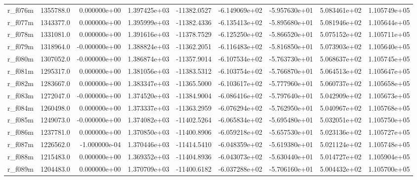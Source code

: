 \documentclass[10pt]{article}
\begin{document}
\begin{landscape}
\begin{longtable}{|l|r|r|r|r|r|r|r|r|}
r\_f076m                 &  1355788.0 &  0.000000e+00 &  1.397425e+03 & -11382.0527 & -6.149069e+02 & -5.957630e+01 &  5.083461e+02 &  1.105749e+05 \\
r\_f077m                 &  1343377.0 &  0.000000e+00 &  1.395999e+03 & -11382.4336 & -6.135413e+02 & -5.895680e+01 &  5.081946e+02 &  1.105644e+05 \\
r\_f078m                 &  1331081.0 &  0.000000e+00 &  1.391616e+03 & -11378.7529 & -6.125250e+02 & -5.866520e+01 &  5.075152e+02 &  1.105711e+05 \\
r\_f079m                 &  1318964.0 & -0.000000e+00 &  1.388824e+03 & -11362.2051 & -6.116483e+02 & -5.816850e+01 &  5.073903e+02 &  1.105640e+05 \\
r\_f080m                 &  1307052.0 & -0.000000e+00 &  1.386874e+03 & -11357.9014 & -6.107534e+02 & -5.763730e+01 &  5.068637e+02 &  1.105745e+05 \\
r\_f081m                 &  1295317.0 &  0.000000e+00 &  1.381056e+03 & -11383.5312 & -6.103754e+02 & -5.766870e+01 &  5.064513e+02 &  1.105647e+05 \\
r\_f082m                 &  1283667.0 &  0.000000e+00 &  1.383347e+03 & -11365.5000 & -6.103617e+02 & -5.777960e+01 &  5.060737e+02 &  1.105658e+05 \\
r\_f083m                 &  1272047.0 & -0.000000e+00 &  1.374520e+03 & -11384.9004 & -6.086416e+02 & -5.797640e+01 &  5.042909e+02 &  1.105673e+05 \\
r\_f084m                 &  1260498.0 &  0.000000e+00 &  1.373337e+03 & -11363.2959 & -6.076294e+02 & -5.762950e+01 &  5.040967e+02 &  1.105768e+05 \\
r\_f085m                 &  1249073.0 & -0.000000e+00 &  1.374082e+03 & -11402.5264 & -6.065834e+02 & -5.695480e+01 &  5.032051e+02 &  1.105750e+05 \\
r\_f086m                 &  1237781.0 &  0.000000e+00 &  1.370850e+03 & -11400.8906 & -6.059218e+02 & -5.657530e+01 &  5.023136e+02 &  1.105727e+05 \\
r\_f087m                 &  1226562.0 & -1.000000e-04 &  1.370446e+03 & -11414.5410 & -6.048359e+02 & -5.619380e+01 &  5.021124e+02 &  1.105748e+05 \\
r\_f088m                 &  1215483.0 &  0.000000e+00 &  1.369352e+03 & -11404.8936 & -6.043073e+02 & -5.630440e+01 &  5.014727e+02 &  1.105904e+05 \\
r\_f089m                 &  1204483.0 &  0.000000e+00 &  1.370709e+03 & -11400.6182 & -6.037288e+02 & -5.706160e+01 &  5.004432e+02 &  1.105700e+05 \\

\end{longtable}
\end{landscape}
\end{document}
